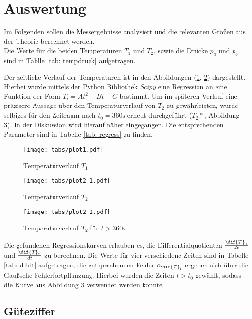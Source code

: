 \section{Auswertung}
Im Folgenden sollen die Messergebnisse analysiert und die relevanten Größen aus der Theorie berechnet werden. \\
Die Werte für die beiden Temperaturen $T_1$ und $T_2$, sowie die Drücke $p_a$ und $p_b$ sind in Tablle \ref{tab: tempdruck} aufgetragen.

Der zeitliche Verlauf der Temperaturen ist in den Abbildungen (\ref{fig: plot1}, \ref{fig: plot2}) dargestellt. Hierbei wurde mittels der Python Bibliothek \emph{Scipy} eine %
Regression an eine Funktion der Form $T_i = A t^2 + B t + C$ bestimmt. Um im späteren Verlauf eine präzisere Aussage über den Temperaturverlauf
von $T_2$ zu gewährleisten, wurde selbiges für den Zeitraum nach $t_0 = 360 \si{\second}$ erneut durchgeführt ($T_2*$, Abbildung \ref{fig: plot2*}). In der Diskussion wird hierauf näher eingegangen. Die entsprechenden
Parameter sind in Tabelle \ref{tab: regress} zu finden. \\


\begin{figure}
  \centering
  \texttt{[image: tabs/plot1.pdf]}
  \caption{Temperaturverlauf $T_1$}
  \label{fig: plot1}
\end{figure}

\begin{figure}
  \centering
  \texttt{[image: tabs/plot2\_1.pdf]}
  \caption{Temperaturverlauf $T_2$}
  \label{fig: plot2}
\end{figure}

\begin{figure}
  \centering
  \texttt{[image: tabs/plot2\_2.pdf]}
  \caption{Temperaturverlauf $T_2$ für $t > 360 \si{\second}$}
  \label{fig: plot2*}
\end{figure}


Die gefundenen Regressionskurven erlauben es, die Differentialquotienten $\frac{\dif{T}_1}{dt}$ und $\frac{\dif{T}_2}{dt}$ zu berechnen. Die Werte für vier verschiedene  Zeiten sind %
in Tabelle \ref{tab: dTdt} aufgetragen, die entsprechenden Fehler $o_{\dif{T}_i}$ ergeben sich über die Gaußsche Fehlerfortpflanzung. Hierbei wurden die Zeiten $t > t_0$ gewählt, sodass die Kurve aus Abbildung \ref{fig: plot2*} verwendet werden konnte. %

\subsection{Güteziffer}

